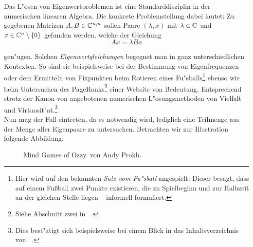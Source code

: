 Das L"osen von Eigenwertproblemen ist eine Standarddisziplin in der
numerischen linearen Algebra. Die konkrete Problemstellung dabei lautet: Zu gegebenen Matrizen $A,B\in\mathbb{C}^{n,n}$ sollen Paare $(\lambda, x)$ mit $\lambda\in\mathbb{C}$ und $x\in\mathbb{C}^n \setminus\{0\}$ gefunden werden, welche
der Gleichung
\begin{equation}\label{chap1:eq:eigenproblem}
Ax = \lambda Bx
\end{equation}

gen"ugen. Solchen \emph{Eigenwertgleichungen} begegnet man in ganz unterschiedlichen Kontexten.
So sind sie beispielsweise bei der Bestimmung von Eigenfrequenzen oder dem Ermitteln von Fixpunkten beim
Rotieren eines Fu"sballs\footnote{Hier wird auf den bekannten
\emph{Satz vom Fu"sball} angespielt. Dieser besagt, dass auf einem Fußball
zwei Punkte existieren, die zu Spielbeginn und zur Halbzeit
an der gleichen Stelle liegen -- informell formuliert.} ebenso wie beim
Untersuchen des PageRanks\footnote{
Siehe Abschnitt zwei in ~\cite{page}.
} einer Website von
Bedeutung. Entsprechend strotz der Kanon von angebotenen numerischen
L"osungsmethoden von Vielfalt und Virtuosit"at.\footnote{Dies best"atigt sich beispielsweise bei einem Blick in das Inhaltsverzeichnis von ~\cite{stewart}.}\\

Nun mag der Fall eintreten, da es notwendig wird, lediglich eine Teilmenge
aus der Menge aller Eigenpaare zu untersuchen. Betrachten wir zur Illustration folgende Abbildung.

\begin{figure}[h!]
  \centering
  \caption{\glqq Mind Games of Ozzy\grqq\ von Andy Prokh.}\label{chap1:im:cat}
\end{figure}

